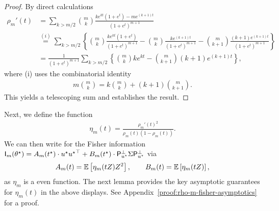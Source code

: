 \begin{proof}
	By direct calculations
	\begin{align*}
		\rho_m'(t) &  = \sum_{k > m/2} \binom{m}{k} \frac{ke^{kt} (1+e^t) - me^{(k+1)t}}{(1+e^t)^{m+1}} \\
		&  \stackrel{(i)}{=} \sum_{k > m/2} \left\{  \binom{m}{k} \frac{ke^{kt}(1+e^t)}{(1+e^t)^{m+1}} - \binom{m}{k} \frac{ke^{(k+1)t}}{(1+e^t)^{m+1}} - \binom{m}{k+1} \frac{(k+1)e^{(k+1)t}}{(1+e^t)^{m+1}} \right\} \nonumber \\
		& = \frac{1}{(1+e^t)^{m+1}}\sum_{k > m/2} \left\{ \binom{m}{k} ke^{kt} - \binom{m}{k+1} (k+1)e^{(k+1)t}\right\}, 
	\end{align*}
	where (i) uses the combinatorial identity
	\begin{align*}
		m \binom{m}{k} = k \binom{m}{k} + (k+1)\binom{m}{k+1}.
	\end{align*}
	This yields a telescoping sum and establishes the result.
\end{proof}
Next,  we define the function
\begin{align*}
	\eta_m(t) = \frac{\rho_m'(t)^2}{\rho_m(t)(1-\rho_m(t))}.
\end{align*}
We can then write for the Fisher information $\mathsf{I}_m(\theta^\star) = A_m (t^\star) \cdot u^\star {u^\star}^\top +   B_m (t^\star) \cdot \mathsf{P}_{u^\star}^\perp \Sigma \mathsf{P}_{u^\star}^\perp $ via
\begin{align*}
	A_m(t) = \mathbb{E} \left[{\eta_m(tZ)Z^2}\right], \qquad B_m(t) = \mathbb{E} \left[{\eta_m(tZ)}\right],
\end{align*}
as $\eta_m$ is a even function. The next lemma provides the key asymptotic
guarantees for $\eta_m(t)$ in the above displays. See
Appendix~\ref{proof:rho-m-fisher-asymptotics} for a proof.

